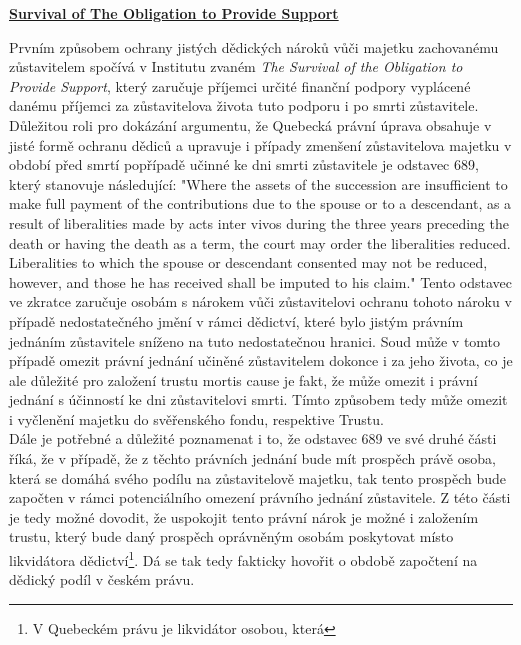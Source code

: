 \documentclass{article}
\begin{document}
\vspace{5 mm}

\underline{\textbf{Survival of The Obligation to Provide Support}}

Prvním způsobem ochrany jistých dědických nároků vůči majetku zachované\-mu zůstavitelem spočívá v Institutu zvaném \textit{The Survival of the Obligation to Provide Support}, který zaručuje příjemci určité finanční podpory vyplácené danému příjemci za zůstavitelova života tuto podporu i po smrti zůstavitele. \\

Důležitou roli pro dokázání argumentu, že Quebecká právní úprava obsahuje v jisté formě ochranu dědiců a upravuje i případy zmenšení zůstavitelova majetku v období před smrtí popřípadě učinné ke dni smrti zůstavitele je odstavec 689, který stanovuje následující: "Where the assets of the succession are insufficient to make full payment of the contributions due to the spouse or to a descendant, as a result of liberalities made by acts inter vivos during the three years preceding the death or having the death as a term, the court may order the liberalities reduced. \\

Liberalities to which the spouse or descendant consented may not be reduced, however, and those he has received shall be imputed to his claim." Tento odstavec ve zkratce zaručuje osobám s nárokem vůči zůstavitelovi ochranu tohoto nároku v případě nedostatečného jmění v rámci dědictví, které bylo jistým právním jednáním zůstavitele sníženo na tuto nedostatečnou hranici. Soud může v tomto případě omezit právní jednání učiněné zůstavitelem dokonce i za jeho života, co je ale důležité pro založení trustu mortis cause je fakt, že může omezit i právní jednání s účinností ke dni zůstavitelovi smrti. Tímto způsobem tedy může omezit i vyčlenění majetku do svěřenského fondu, respektive Trustu. \\

Dále je potřebné a důležité poznamenat i to, že odstavec 689 ve své druhé části říká, že v případě, že z těchto právních jednání bude mít prospěch právě osoba, která se domáhá svého podílu na zůstavitelově majetku, tak tento prospěch bude započten v rámci potenciálního omezení právního jednání zůstavitele. Z této části je tedy možné dovodit, že uspokojit tento právní nárok je možné i založením trustu, který bude daný prospěch oprávněným osobám poskytovat místo likvidátora dědictví\footnote{V Quebeckém právu je likvidátor osobou, která}. Dá se tak tedy fakticky hovořit o obdobě započtení na dědický podíl v českém právu.
\end{document}

